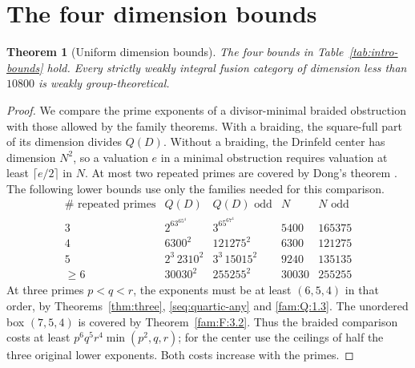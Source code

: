\documentclass[11pt,a4paper]{article}
\numberwithin{equation}{section}
\newtheorem{theorem}{Theorem}[section]
\theoremstyle{remark}
\begin{document}
\section{The four dimension bounds}\label{sec:numerical}
\begin{theorem}[Uniform dimension bounds]\label{thm:uniform-new-bounds}\label{seq:end-bounds}\label{thm:unbraided-range}
The four bounds in Table~\ref{tab:intro-bounds} hold. Every strictly weakly
integral fusion category of dimension less than $10800$ is weakly
group-theoretical.
\end{theorem}
\begin{proof}
We compare the prime exponents of a divisor-minimal braided obstruction with
those allowed by the family theorems. With a braiding, the square-full part
of its dimension divides $Q(D)$. Without a braiding, the Drinfeld center
has dimension $N^2$, so a valuation $e$ in a minimal obstruction requires
valuation at least $\lceil e/2\rceil$ in $N$. At most two repeated primes
are covered by Dong's theorem \cite[Theorem~3.1]{DongWeakIntegral}.
The following lower bounds use only the families needed for this comparison.
\[
\begin{array}{c|rrrr}
\#\text{ repeated primes}&Q(D)&Q(D)\text{ odd}&N&N\text{ odd}\\\hline
3&2^63^65^4&3^65^67^4&5400&165375\\
4&6300^2&121275^2&6300&121275\\
5&2^3\,2310^2&3^3\,15015^2&9240&135135\\
\ge6&30030^2&255255^2&30030&255255
\end{array}
\]
At three primes $p<q<r$, the exponents must be at least $(6,5,4)$ in
that order, by Theorems~\ref{thm:three}, \ref{seq:quartic-any} and
\ref{fam:Q:1.3}. The unordered box $(7,5,4)$ is covered by
Theorem~\ref{fam:F:3.2}. Thus the braided comparison costs at least
$p^6q^5r^4\min(p^2,q,r)$; for the center use the ceilings of half the
three original lower exponents. Both costs increase with the primes.


\end{proof}
\end{document}
